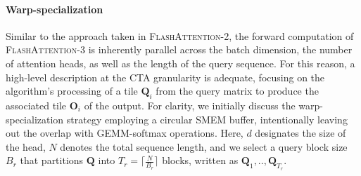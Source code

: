 \paragraph{Warp-specialization}
Similar to the approach taken in \textsc{FlashAttention-2}, the forward computation of \textsc{FlashAttention-3} is inherently parallel across the batch dimension, the number of attention heads, as well as the length of the query sequence. For this reason, a high-level description at the CTA granularity is adequate, focusing on the algorithm's processing of a tile $\mathbf{Q}_i$ from the query matrix to produce the associated tile $\mathbf{O}_i$ of the output. For clarity, we initially discuss the warp-specialization strategy employing a circular SMEM buffer, intentionally leaving out the overlap with GEMM-softmax operations. Here, $d$ designates the size of the head, $N$ denotes the total sequence length, and we select a query block size $B_r$ that partitions $\mathbf{Q}$ into $T_r = \lceil \frac{N}{B_r} \rceil$ blocks, written as $\mathbf{Q}_1, .., \mathbf{Q}_{T_r}$.

